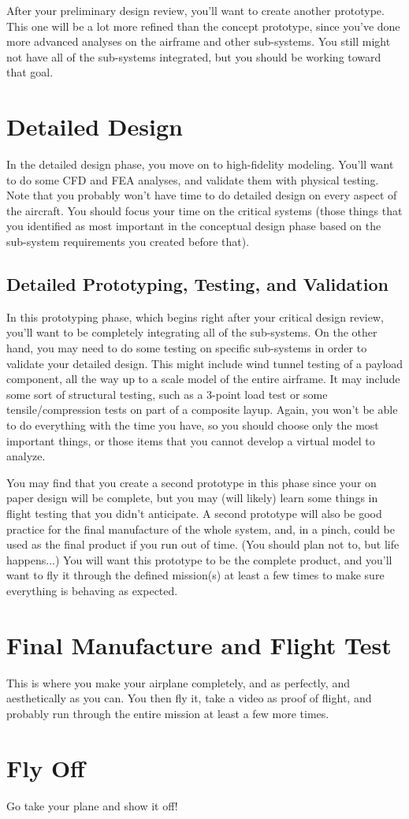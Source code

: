 \documentclass[report]{byu-aero}
\begin{document}
After your preliminary design review, you'll want to create another prototype. This one will be a lot more refined than the concept prototype, since you've done more advanced analyses on the airframe and other sub-systems.  You still might not have all of the sub-systems integrated, but you should be working toward that goal.

\section{Detailed Design}
In the detailed design phase, you move on to high-fidelity modeling. You'll want to do some CFD and FEA analyses, and validate them with physical testing. Note that you probably won't have time to do detailed design on every aspect of the aircraft. You should focus your time on the critical systems (those things that you identified as most important in the conceptual design phase based on the sub-system requirements you created before that). 

\subsection{Detailed Prototyping, Testing, and Validation}
In this prototyping phase, which begins right after your critical design review, you'll want to be completely integrating all of the sub-systems. On the other hand, you may need to do some testing on specific sub-systems in order to validate your detailed design. This might include wind tunnel testing of a payload component, all the way up to a scale model of the entire airframe. It may include some sort of structural testing, such as a 3-point load test or some tensile/compression tests on part of a composite layup.  Again, you won't be able to do everything with the time you have, so you should choose only the most important things, or those items that you cannot develop a virtual model to analyze. 

You may find that you create a second prototype in this phase since your on paper design will be complete, but you may (will likely) learn some things in flight testing that you didn't anticipate. A second prototype will also be good practice for the final manufacture of the whole system, and, in a pinch, could be used as the final product if you run out of time. (You should plan not to, but life happens...) You will want this prototype to be the complete product, and you'll want to fly it through the defined mission(s) at least a few times to make sure everything is behaving as expected.  

\section{Final Manufacture and Flight Test}
This is where you make your airplane completely, and as perfectly, and aesthetically as you can.  You then fly it, take a video as proof of flight, and probably run through the entire mission at least a few more times.

\section{Fly Off}
Go take your plane and show it off!
\end{document}
